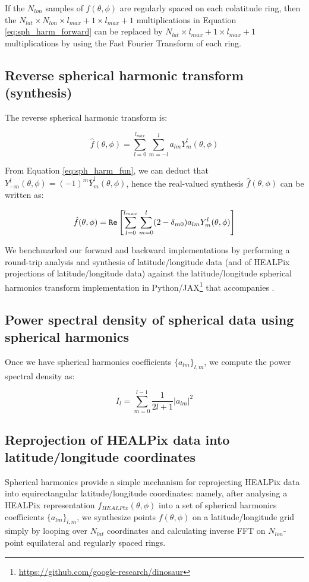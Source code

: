 If the $N_{lon}$ samples of $f(\theta,\phi)$ are regularly spaced on each colatitude ring, then the $N_{lat} \times N_{lon} \times {l_{max}+1} \times {l_{max}+1}$ multiplications in Equation \ref{eq:sph_harm_forward} can be replaced by $N_{lat} \times {l_{max}+1} \times {l_{max}+1}$ multiplications by using the Fast Fourier Transform of each ring.

\subsection{Reverse spherical harmonic transform (synthesis)}

The reverse spherical harmonic transform is:

\begin{equation}
\hat f(\theta, \phi) = \sum_{l=0}^{l_{max}}\sum_{m=-l}^l a_{lm}Y_m^l(\theta, \phi)
\label{eq:sph_harm_backward}
\end{equation}

From Equation \ref{eq:sph_harm_fun}, we can deduct that $Y_{-m}^l(\theta, \phi) = (-1)^m \bar{Y}_m^l(\theta, \phi)$, hence the real-valued synthesis $\hat f(\theta, \phi)$ can be written as:

\begin{equation}
\hat f(\theta, \phi) = {\tt Re} \left [ \sum_{l=0}^{l_{max}}\sum_{m=0}^l (2 - \delta_{m0}) a_{lm}Y_m^l(\theta, \phi) \right ]
\label{eq:sph_harm_backward_real}
\end{equation}


We benchmarked our forward and backward implementations by performing a round-trip analysis and synthesis of latitude/longitude data (and of HEALPix projections of latitude/longitude data) against the latitude/longitude spherical harmonics transform implementation in Python/JAX\footnote{\url{https://github.com/google-research/dinosaur}} that accompanies \citep{hoyer2023neural}.

\subsection{Power spectral density of spherical data using spherical harmonics}

Once we have spherical harmonics coefficients $\{a_{lm}\}_{l,m}$, we compute the power spectral density as:

\begin{equation}
I_l = \sum _{m=0}^{l-1} \frac{1}{2l + 1} | a_{lm} |^2
\end{equation}

\subsection{Reprojection of HEALPix data into latitude/longitude coordinates}

Spherical harmonics provide a simple mechanism for reprojecting HEALPix data into equirectangular latitude/longitude coordinates: namely, after analysing a HEALPix representation $f_{HEALPix}(\theta, \phi)$ into a set of spherical harmonics coefficients $\{a_{lm}\}_{l,m}$, we synthesize points $f(\theta,\phi)$ on a latitude/longitude grid simply by looping over $N_{lat}$ coordinates and calculating inverse FFT on $N_{lon}$-point equilateral and regularly spaced rings.